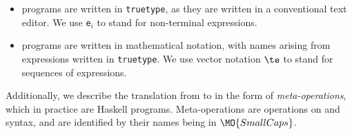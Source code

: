 \begin{itemize}
\item \Idris{} programs are written in \texttt{truetype}, as they are written
in a conventional text editor. We use \texttt{e$_i$} to stand for non-terminal
expressions.
\item \TT{} programs are written in mathematical notation, with names arising
from \Idris{} expressions written in \texttt{truetype}. We use vector notation
$\te$ to stand for sequences of expressions.
\end{itemize}

Additionally, we describe the translation from \Idris{} to \TT{} in the form
of \emph{meta-operations}, which in practice are Haskell programs. Meta-operations
are operations on \Idris{} and \TT{} syntax, and are identified by their names being
in $\MO{SmallCaps}$.


